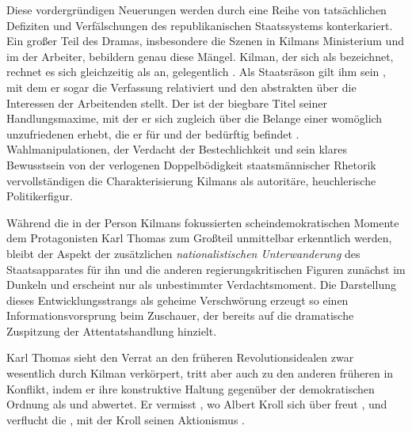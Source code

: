 Diese vordergründigen Neuerungen werden durch eine Reihe von tatsächlichen Defiziten
und Verfälschungen des republikanischen Staatssystems konterkariert. Ein großer
Teil des Dramas, insbesondere die Szenen in Kilmans Ministerium und im
\Cite{Wahllokal} der Arbeiter, bebildern genau diese Mängel.
Kilman, der sich als \Cite{demokratisch}  bezeichnet,
rechnet es sich gleichzeitig als \Cite{Mut} an, gelegentlich \Cite{gegen das
  Volk zu regieren}. Als Staatsräson gilt ihm sein \Cite{gesunder
  Menschenverstand} , mit dem er sogar die Verfassung
relativiert
und den abstrakten \Cite{Mechanismus des Staates}  über die
Interessen der Arbeitenden stellt. Der \Cite{Wille des ganzen Volk}
 ist der biegbare Titel seiner Handlungsmaxime, mit der er
sich zugleich über die Belange einer womöglich unzufriedenen \Cite{Masse}
erhebt, die er für \Cite{unfähig} und der \Cite{Erziehung} bedürftig befindet
. Wahlmanipulationen,  der Verdacht der Bestechlichkeit und sein klares
Bewusstsein von der verlogenen Doppelbödigkeit staatsmännischer Rhetorik
 vervollständigen die Charakterisierung Kilmans als
autoritäre, heuchlerische Politikerfigur.

Während die in der Person Kilmans fokussierten scheindemokratischen Momente
dem Protagonisten Karl Thomas zum Großteil unmittelbar erkenntlich werden,
bleibt der Aspekt der zusätzlichen \emph{nationalistischen Unterwanderung} des
Staatsapparates für ihn und die anderen regierungskritischen Figuren zunächst
im Dunkeln und erscheint nur als unbestimmter
Verdachtsmoment.
Die Darstellung dieses Entwicklungsstrangs als geheime Verschwörung
 erzeugt so
einen Informationsvorsprung beim Zuschauer, der bereits auf die dramatische
Zuspitzung der Attentatshandlung hinzielt.

Karl Thomas sieht den Verrat an den früheren Revolutionsidealen zwar wesentlich
durch Kilman verkörpert, tritt aber auch zu den anderen früheren
\Cite{Genossen} in Konflikt, indem er ihre konstruktive Haltung gegenüber der
demokratischen Ordnung als \Cite{falsch}  und \Cite{feige}
 abwertet. 
Er vermisst \Cite{Taten}, wo Albert Kroll sich über
\Cite{Wahlstimmen} freut , und verflucht die \Cite{Ruhe}
, mit der Kroll seinen Aktionismus \Cite{bremst}
. 

